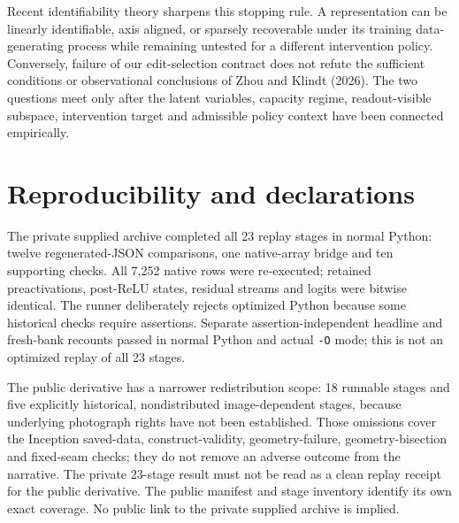 \documentclass[
  british,
  11pt,
  a4paper,
]{article}
\begin{document}
Recent identifiability theory sharpens this stopping rule. A
representation can be linearly identifiable, axis aligned, or sparsely
recoverable under its training data-generating process while remaining
untested for a different intervention policy. Conversely, failure of our
edit-selection contract does not refute the sufficient conditions or
observational conclusions of Zhou and Klindt (2026). The two questions
meet only after the latent variables, capacity regime, readout-visible
subspace, intervention target and admissible policy context have been
connected empirically.

\section{Reproducibility and
declarations}\label{reproducibility-and-declarations}

The private supplied archive completed all 23 replay stages in normal
Python: twelve regenerated-JSON comparisons, one native-array bridge and
ten supporting checks. All 7,252 native rows were re-executed; retained
preactivations, post-ReLU states, residual streams and logits were
bitwise identical. The runner deliberately rejects optimized Python
because some historical checks require assertions. Separate
assertion-independent headline and fresh-bank recounts passed in normal
Python and actual \texttt{-O} mode; this is not an optimized replay of
all 23 stages.

The public derivative has a narrower redistribution scope: 18 runnable
stages and five explicitly historical, nondistributed image-dependent
stages, because underlying photograph rights have not been established.
Those omissions cover the Inception saved-data, construct-validity,
geometry-failure, geometry-bisection and fixed-seam checks; they do not
remove an adverse outcome from the narrative. The private 23-stage
result must not be read as a clean replay receipt for the public
derivative. The public manifest and stage inventory identify its own
exact coverage. No public link to the private supplied archive is
implied.
\end{document}
